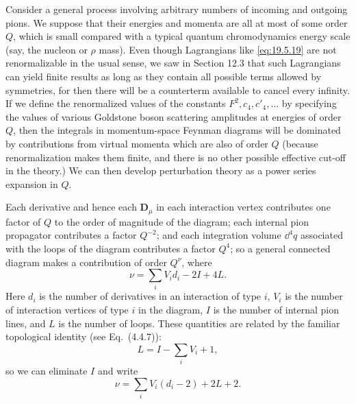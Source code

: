 Consider a general process involving arbitrary numbers of incoming and outgoing pions. We suppose that their energies and momenta are all at most of some order $Q$, which is small compared with a typical quantum chromodynamics energy scale (say, the nucleon or $\rho$ mass). Even though Lagrangians like \eqref{eq:19.5.19} are not renormalizable in the usual sense, we saw in Section 12.3 that such Lagrangians can yield finite results as long as they contain all possible terms allowed by symmetries, for then there will be a counterterm available to cancel every infinity. If we define the renormalized values of the constants $F^2,c_4,c'_4,\ldots$ by specifying the values of various Goldstone boson scattering amplitudes at energies of order $Q$, then the integrals in momentum-space Feynman diagrams will be dominated by contributions from virtual momenta which are also of order $Q$ (because renormalization makes them finite, and there is no other possible effective cut-off in the theory.) We can then develop perturbation theory as a power series expansion in $Q$.

Each derivative and hence each $\boldsymbol D_\mu$ in each interaction vertex contributes one factor of $Q$ to the order of magnitude of the diagram; each internal pion propagator contributes a factor $Q^{-2}$; and each integration volume $\dd^4q$ associated with the loops of the diagram contributes a factor $Q^4$; so a general connected diagram makes a contribution of order $Q^\nu$, where
\begin{equation}
\nu=\sum_iV_i d_i-2I+4L.
\tag{19.5.20}\label{eq:19.5.20}
\end{equation}
Here $d_i$ is the number of derivatives in an interaction of type $i$, $V_i$ is the number of interaction vertices of type $i$ in the diagram, $I$ is the number of internal pion lines, and $L$ is the number of loops. These quantities are related by the familiar topological identity (see Eq.~(4.4.7)):
\begin{equation}
L=I-\sum_iV_i+1,
\tag{19.5.21}\label{eq:19.5.21}
\end{equation}
so we can eliminate $I$ and write
\begin{equation}
\nu=\sum_iV_i(d_i-2)+2L+2.
\tag{19.5.22}\label{eq:19.5.22}
\end{equation}

